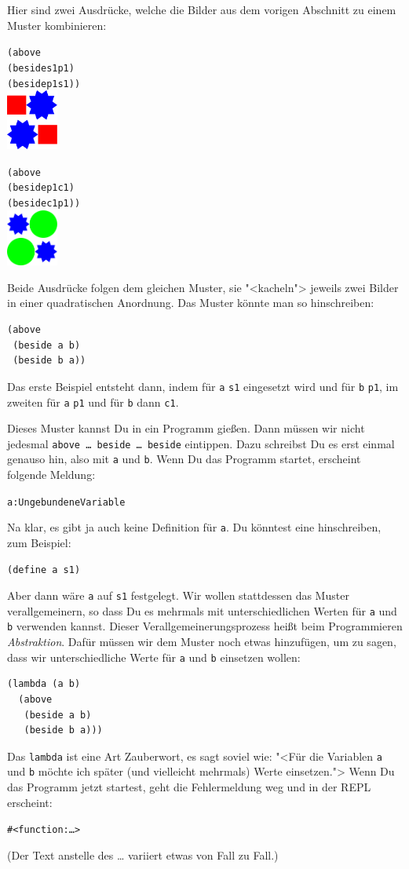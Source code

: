 Hier sind zwei Ausdrücke, welche die Bilder aus dem vorigen Abschnitt
zu einem Muster kombinieren:
%
\begin{alltt}
(above
 (beside s1 p1)
 (beside p1 s1))
\evalsto{} \includegraphics[width=48pt]{i1prog/tile1}

(above
 (beside p1 c1)
 (beside c1 p1))
\evalsto{} \includegraphics[width=48pt]{i1prog/tile2}
\end{alltt}
%
Beide Ausdrücke folgen dem gleichen Muster, sie "<kacheln"> jeweils zwei
Bilder in einer quadratischen Anordnung.  Das Muster könnte man so
hinschreiben:
%
\begin{verbatim}
(above
 (beside a b)
 (beside b a))
\end{verbatim}
%
Das erste Beispiel entsteht dann, indem für \texttt{a} \texttt{s1}
eingesetzt wird und für \texttt{b} \texttt{p1}, im zweiten für \texttt{a}
\texttt{p1} und für \texttt{b} dann \texttt{c1}.

Dieses Muster kannst Du in ein Programm gießen.  Dann müssen wir nicht
jedesmal \texttt{above \ldots{} beside \ldots{} beside} eintippen.
Dazu schreibst Du es erst einmal genauso hin, also mit \texttt{a} und
\texttt{b}.  Wenn Du das Programm startet, erscheint folgende Meldung:
%
\begin{alltt}
\color{red}a: Ungebundene Variable
\end{alltt}
%
Na klar, es gibt ja auch keine Definition für \texttt{a}.  Du könntest
eine hinschreiben, zum Beispiel:
%
\begin{verbatim}
(define a s1)
\end{verbatim}
%
Aber dann wäre \texttt{a} auf \texttt{s1} festgelegt.  Wir wollen
stattdessen das Muster verallgemeinern, so dass Du es mehrmals mit
unterschiedlichen Werten für \texttt{a} und \texttt{b} verwenden
kannst.  Dieser Verallgemeinerungsprozess heißt beim Programmieren
\textit{Abstraktion}.  Dafür müssen wir dem Muster
noch etwas hinzufügen, um zu sagen, dass wir unterschiedliche Werte
für \texttt{a} und \texttt{b} einsetzen wollen:
%
\begin{verbatim}
(lambda (a b)
  (above
   (beside a b)
   (beside b a)))
\end{verbatim}
%
Das \texttt{lambda} ist eine Art Zauberwort, es sagt soviel wie: "<Für
die Variablen \texttt{a} und \texttt{b} möchte ich später (und
vielleicht mehrmals) Werte einsetzen.">  Wenn Du das Programm jetzt
startest, geht die Fehlermeldung weg und in der REPL erscheint:
%
\begin{alltt}
#<function:\ldots>
\end{alltt}
%
(Der Text anstelle des \ldots{} variiert etwas von Fall zu Fall.)

